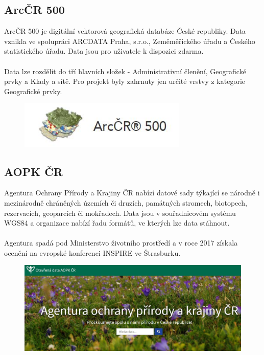 \documentclass[a4paper, 12pt]{article}
\begin{document}
\subsection{ArcČR 500}
ArcČR 500 je digitální vektorová geografická databáze České republiky. Data vznikla ve spolupráci ARCDATA Praha, s.r.o., Zeměměřického úřadu a Českého statistického úřadu. Data jsou pro uživatele k dispozici zdarma. \\
\\
Data lze rozdělit do tří hlavních složek - Administrativní členění, Geografické prvky a Klady a sítě. Pro projekt byly zahrnuty jen určité vrstvy z kategorie Geografické prvky. 

\begin{figure}[h!]
	\centering
	\includegraphics[width=8cm]{pictures/arccr.jpg}
\end{figure}

\subsection{AOPK ČR}
Agentura Ochrany Přírody a Krajiny ČR nabízí datové sady týkající se národně i mezinárodně chráněných územích či druzích, památných stromech, biotopech, rezervacích, geoparcích či mokřadech. Data jsou v souřadnicovém systému WGS84 a organizace nabízí řadu formátů, ve kterých lze data stáhnout.\\
\\
Agentura spadá pod Ministerstvo životního prostředí a v roce 2017 získala ocenění na evropské konferenci INSPIRE ve Štrasburku. 

\begin{figure}[h!]
	\centering
	\includegraphics[width=12cm]{pictures/aopk.jpg}
\end{figure}
\end{document}

